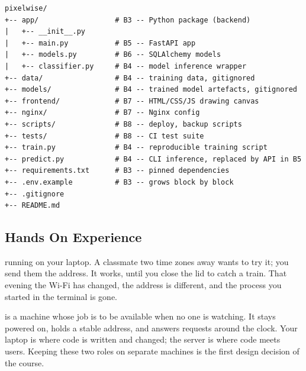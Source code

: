 \begin{verbatim}
pixelwise/
+-- app/                  # B3 -- Python package (backend)
|   +-- __init__.py
|   +-- main.py           # B5 -- FastAPI app
|   +-- models.py         # B6 -- SQLAlchemy models
|   +-- classifier.py     # B4 -- model inference wrapper
+-- data/                 # B4 -- training data, gitignored
+-- models/               # B4 -- trained model artefacts, gitignored
+-- frontend/             # B7 -- HTML/CSS/JS drawing canvas
+-- nginx/                # B7 -- Nginx config
+-- scripts/              # B8 -- deploy, backup scripts
+-- tests/                # B8 -- CI test suite
+-- train.py              # B4 -- reproducible training script
+-- predict.py            # B4 -- CLI inference, replaced by API in B5
+-- requirements.txt      # B3 -- pinned dependencies
+-- .env.example          # B3 -- grows block by block
+-- .gitignore
+-- README.md
\end{verbatim}


\fi

\subsection{Hands On Experience}

 running on your laptop.
A classmate two time zones away wants to try it; you send them the address.
It works, until you close the lid to catch a train.
That evening the Wi-Fi has changed, the address is different,
and the process you started in the terminal is gone.


 is a machine whose job is to be available when no one is watching.
It stays powered on, holds a stable address, and answers requests around the clock.
Your laptop is where code is written and changed; the server is where code meets users.
Keeping these two roles on separate machines is the first design decision of the course.

